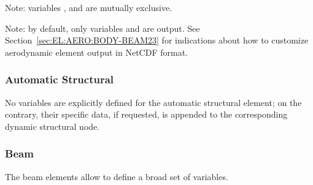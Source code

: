 Note: variables ,  and 
are mutually exclusive.

Note: by default, only variables 
and  are output.
See Section~\ref{sec:EL:AERO:BODY-BEAM23} for indications
about how to customize aerodynamic element output in NetCDF format.


\subsubsection{Automatic Structural}
\label{sec:NetCDF:Elem:Automatic Structural}
No variables are explicitly defined for the automatic structural
element; on the contrary, their specific data, if requested,
is appended to the corresponding dynamic structural node.


\subsubsection{Beam}
\label{sec:NetCDF:Elem:Beam}

The beam elements allow to define a broad set of variables.


